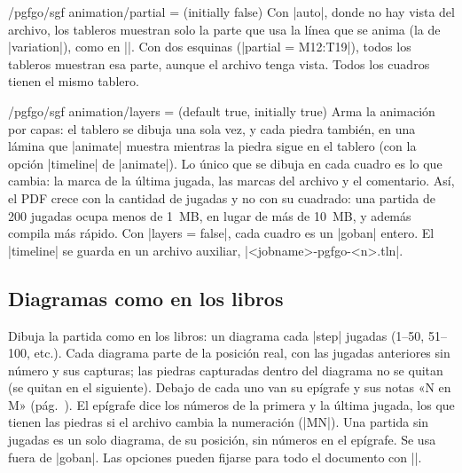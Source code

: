 \begin{key}{/pgfgo/sgf animation/partial =  (initially false)}
	Con |auto|, donde no hay vista del archivo, los tableros muestran solo la parte que usa la línea que se anima (la de |variation|), como en |\sgfdiagrams|. Con dos esquinas (|partial = M12:T19|), todos los tableros muestran esa parte, aunque el archivo tenga vista. Todos los cuadros tienen el mismo tablero.
\end{key}

\begin{key}{/pgfgo/sgf animation/layers =  (default true, initially true)}
	Arma la animación por capas: el tablero se dibuja una sola vez, y cada piedra también, en una lámina que |animate| muestra mientras la piedra sigue en el tablero (con la opción |timeline| de |animate|). Lo único que se dibuja en cada cuadro es lo que cambia: la marca de la última jugada, las marcas del archivo y el comentario. Así, el PDF crece con la cantidad de jugadas y no con su cuadrado: una partida de 200 jugadas ocupa menos de 1~MB, en lugar de más de 10~MB, y además compila más rápido. Con |layers = false|, cada cuadro es un |goban| entero. El |timeline| se guarda en un archivo auxiliar, |<jobname>-pgfgo-<n>.tln|.
\end{key}

\subsection{Diagramas como en los libros}
\label{subsec:sgfdiagramas}

\begin{command}{\sgfdiagrams{}}
	Dibuja la partida como en los libros: un diagrama cada |step| jugadas (1--50, 51--100, etc.). Cada diagrama parte de la posición real, con las jugadas anteriores sin número y sus capturas; las piedras capturadas dentro del diagrama no se quitan (se quitan en el siguiente). Debajo de cada uno van su epígrafe y sus notas «N en M» (pág.~\pageref{subsec:notas}). El epígrafe dice los números de la primera y la última jugada, los que tienen las piedras si el archivo cambia la numeración (|MN|). Una partida sin jugadas es un solo diagrama, de su posición, sin números en el epígrafe. Se usa fuera de |goban|. Las opciones pueden fijarse para todo el documento con ||.

	\begin{codeexample}
	\end{codeexample}
\end{command}

